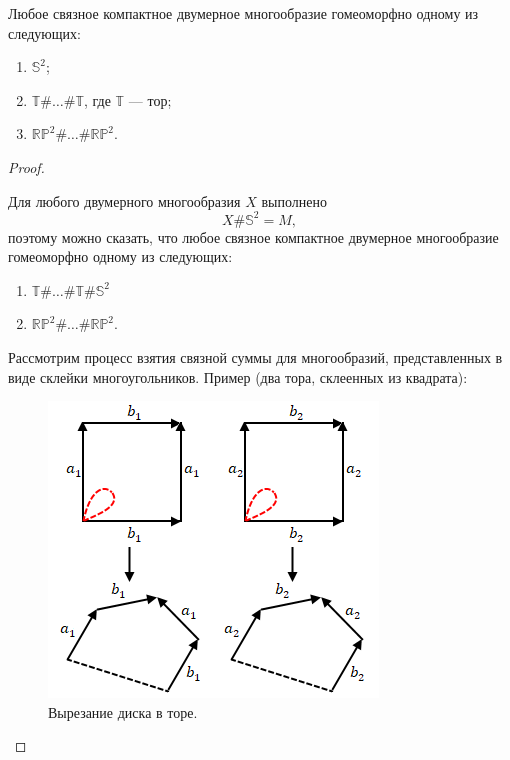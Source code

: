\begin{theorem}
    Любое связное компактное двумерное многообразие гомеоморфно одному из следующих:
    \begin{enumerate}
        \item $\mathbb{S}^2$;
        \item $\mathbb{T} \# \dots \# \mathbb{T}$, где $\mathbb{T}$ — тор;
        \item $\mathbb{RP}^2 \# \dots \# \mathbb{RP}^2$.
    \end{enumerate}
\end{theorem} 
\begin{proof}
    \begin{remark}
        Для любого двумерного многообразия $X$ выполнено
        \[X \# \mathbb{S}^2 = M,\]
        поэтому можно сказать, что любое связное компактное двумерное многообразие гомеоморфно одному из следующих:
        \begin{enumerate}
            \item $\mathbb{T} \# \dots \# \mathbb{T} \# \mathbb{S}^2$
            \item $\mathbb{RP}^2 \# \dots \# \mathbb{RP}^2$.
        \end{enumerate}
    \end{remark}

    Рассмотрим процесс взятия связной суммы для многообразий, представленных в виде склейки многоугольников. Пример (два тора, склеенных из квадрата):

    \begin{figure}[ht]
        \centering
        \includegraphics[scale=0.7]{images/c11.4.png}
        \caption{Вырезание диска в торе.}
        \label{fig:c11.4}
    \end{figure}


\end{proof}
